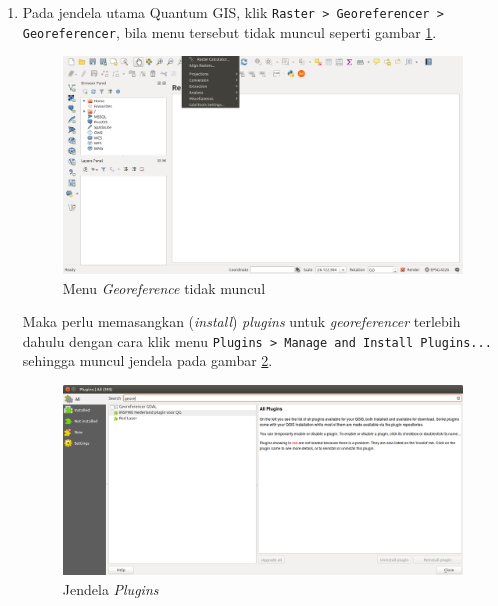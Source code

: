 \begin{enumerate}[1.]

  \item Pada jendela utama Quantum GIS, klik \verb|Raster > Georeferencer > Georeferencer|, bila menu tersebut tidak muncul seperti gambar \ref{fig:georefmenunotexists}.
  
  \begin{figure}[H]
    \centering
    \includegraphics[width=1\textwidth]{./resources/018-menu-georeference-not-exists}
    \caption{Menu \textit{Georeference} tidak muncul}
    \label{fig:georefmenunotexists}
  \end{figure}
  
  Maka perlu memasangkan (\textit{install}) \textit{plugins} untuk \textit{georeferencer} terlebih dahulu dengan cara klik menu \verb|Plugins > Manage and Install Plugins...| sehingga muncul jendela pada gambar \ref{fig:pluginswin}.
  
  \begin{figure}[H]
    \centering
    \includegraphics[width=1\textwidth]{./resources/020-pluginswin}
    \caption{Jendela \textit{Plugins}}
    \label{fig:pluginswin}
  \end{figure}
  

\end{enumerate}

